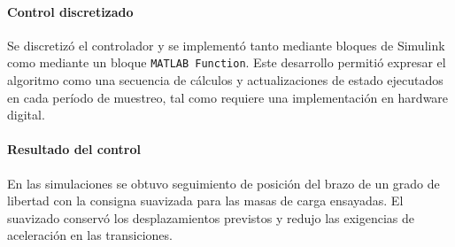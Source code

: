 \documentclass[blue,fullpaper]{ludusofficial}  %
\begin{document}
\paragraph{Control discretizado}
Se discretizó el controlador y se implementó tanto mediante
bloques de Simulink como mediante un bloque \texttt{MATLAB Function}.
Este desarrollo permitió expresar el algoritmo como una secuencia
de cálculos y actualizaciones de estado ejecutados en cada período
de muestreo, tal como requiere una implementación en hardware digital.

\paragraph{Resultado del control}
En las simulaciones se obtuvo seguimiento de posición del brazo
de un grado de libertad con la consigna suavizada para las masas
de carga ensayadas. El suavizado conservó los desplazamientos
previstos y redujo las exigencias de aceleración en las transiciones.

\clearpage


\nocite{julian2026guia,astrom2020feedback,ogata2010control}


\end{document}
